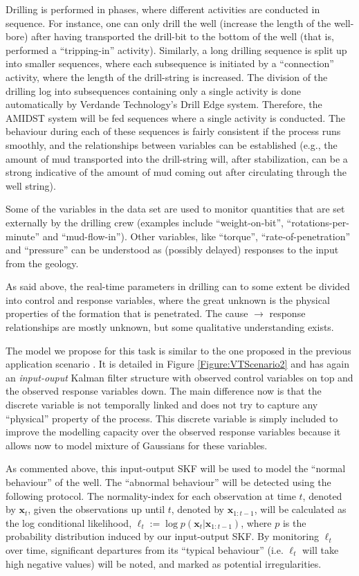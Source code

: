 Drilling is performed in phases, where different activities are conducted in sequence. For instance, one can only drill the well (increase the length of the well-bore) after having transported the drill-bit to the bottom of the well (that is, performed a ``tripping-in'' activity). Similarly, a long drilling sequence is split up into smaller sequences, where each subsequence is initiated by a ``connection'' activity, where the length of the drill-string is increased.
The division of the drilling log into subsequences containing only a single activity is done automatically by Verdande Technology's Drill Edge system. 
Therefore, the AMIDST system will be fed sequences where a single activity is conducted. 
The behaviour during each of these sequences  is fairly consistent if the process runs smoothly, and the relationships between variables can be established (e.g., the amount of mud transported into the drill-string will, after stabilization, can be a strong indicative of the amount of mud coming out after circulating through the well string). 

Some of the variables in the data set are used to monitor quantities that are set externally by the drilling crew (examples include ``weight-on-bit'', ``rotations-per-minute'' and ``mud-flow-in''). Other variables, like ``torque'', ``rate-of-penetration'' and ``pressure'' can be understood as (possibly delayed) responses to the input from the geology. 

As said above, the real-time parameters in drilling can to some extent be divided into control and response variables, where the great unknown is the physical properties of the formation that is penetrated.  The cause $\rightarrow$ response relationships are mostly unknown, but some qualitative understanding exists. 

The model we propose for this task is similar to the one proposed in the previous application scenario . It is detailed in Figure \ref{Figure:VTScenario2} and has again an \emph{input-ouput} Kalman filter structure with observed control variables on top and the observed response variables down. The main difference now is that the discrete variable is not temporally linked and does not try to capture any ``physical'' property of the process. This discrete variable is simply included to improve the modelling capacity over the observed response variables because it allows now to model mixture of Gaussians for these variables. 

As commented above, this input-output SKF  will be used to model the ``normal behaviour'' of the well. The ``abnormal behaviour'' will be detected using the following protocol.  The normality-index for each observation at time $t$, denoted by ${\bm x}_t$, given the observations up until $t$, denoted by ${\bm x}_{1:t-1}$, will be calculated as the log conditional likelihood, $\ell_t := \log p\left({\bm x}_t|{\bm x}_{1:t-1}\right)$, where $p$ is the probability distribution induced by our input-output SKF. By monitoring $\ell_t$ over time, significant departures from its ``typical behaviour'' (i.e. $\ell_t$ will take high negative values)  will be noted, and marked as potential irregularities.


